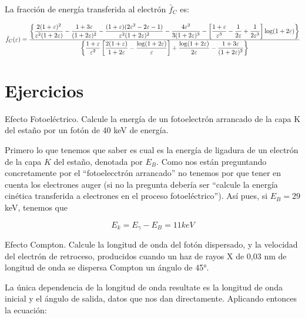 La fracción de energía transferida al electrón $\bar{f}_C$ es: 

\begin{equation} \scriptsize
\bar{f}_C(\varepsilon) =
\frac{
\left\{
\dfrac{2(1+\varepsilon)^2}{\varepsilon^2(1+2\varepsilon)}
- \dfrac{1+3\varepsilon}{(1+2\varepsilon)^2}
- \dfrac{(1+\varepsilon)(2\varepsilon^2 - 2\varepsilon - 1)}{\varepsilon^2(1+2\varepsilon)^2}
- \dfrac{4\varepsilon^2}{3(1+2\varepsilon)^3}
- \left[\dfrac{1+\varepsilon}{\varepsilon^3} - \dfrac{1}{2\varepsilon} + \dfrac{1}{2\varepsilon^3}\right] \log(1+2\varepsilon)
\right\}
}{
\left\{
\dfrac{1+\varepsilon}{\varepsilon^2} \left[\dfrac{2(1+\varepsilon)}{1+2\varepsilon} - \dfrac{\log(1+2\varepsilon)}{\varepsilon}\right]
+ \dfrac{\log(1+2\varepsilon)}{2\varepsilon}
- \dfrac{1+3\varepsilon}{(1+2\varepsilon)^2}
\right\}
}
\end{equation}

\section*{Ejercicios}

\begin{Ejercicio}{Efecto Fotoeléctrico.}
    Calcule la energía de un fotoelectrón arrancado de la capa K del estaño por un fotón de 40 keV de energía.
\end{Ejercicio}

Primero lo que tenemos que saber es cual es la energía de ligadura de un electrón de la capa $K$ del estaño, denotada por $E_B$. Como nos están preguntando concretamente por el ``fotoelecctrón arrancado'' no tenemos por que tener en cuenta los electrones auger (si no la pregunta debería ser ``calcule la energía cinética transferida a electrones en el proceso fotoeléctrico''). Así pues, si $E_B=29$ keV, tenemos que 

\begin{equation}
    E_k = E_{\gamma} - E_B = 11 \unit{keV}
\end{equation}

\begin{Ejercicio}{Efecto Compton.}
    Calcule la longitud de onda del fotón dispersado, y la velocidad del electrón de retroceso, producidos cuando un haz de rayos X de 0,03 nm de longitud de onda se dispersa Compton un ángulo de 45°.
\end{Ejercicio}

La única dependencia de la longitud de onda resultate es la longitud de onda inicial y el ángulo de salida, datos que nos dan directamente. Aplicando entonces la ecuación: 

